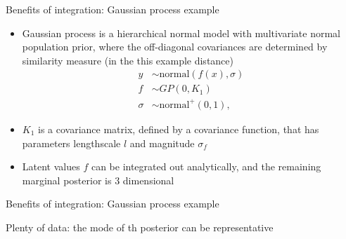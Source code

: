 \documentclass[english,t]{beamer}
\begin{document}
\begin{frame}{Benefits of integration: Gaussian process example}

  \begin{itemize}
  \item<+-> Gaussian process is a hierarchical normal model with
    multivariate normal population prior, where the off-diagonal
    covariances are determined by similarity measure (in the this
    example distance)
    \begin{align*}
      y & \sim \mbox{normal}(f(x), \sigma)\\
      f & \sim GP(0, K_1)\\
      \sigma & \sim \mbox{normal}^{+}(0, 1),
    \end{align*}
  \item<+-> $K_1$ is a covariance matrix, defined by a covariance
    function, that has parameters lengthscale $l$ and magnitude
    $\sigma_f$
  \item<+-> Latent values $f$ can be integrated out analytically, and the
    remaining marginal posterior is 3 dimensional
  \end{itemize}
\end{frame}

\begin{frame}{Benefits of integration: Gaussian process example}

  Plenty of data: the mode of th posterior can be representative
  
  
\end{frame}
\end{document}
